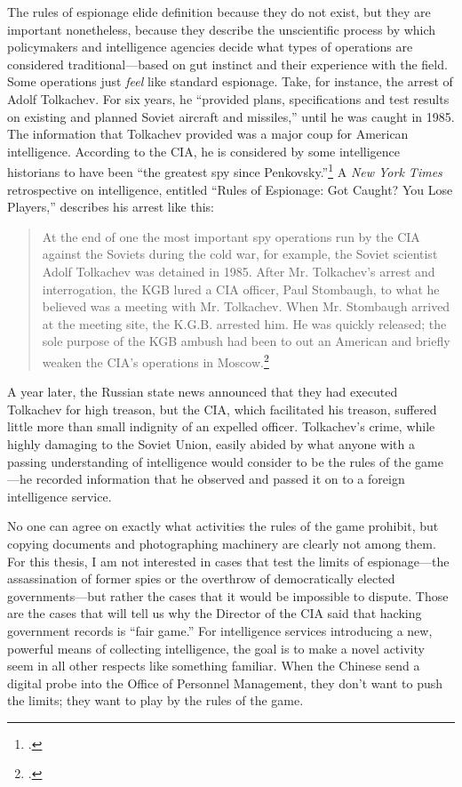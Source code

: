 \documentclass{memoir}
\begin{document}
\begin{refsegment}
The rules of espionage elide definition because they do not exist, but they are important nonetheless, because they describe the unscientific process by which policymakers and intelligence agencies decide what types of operations are considered traditional---based on gut instinct and their experience with the field. Some operations just \emph{feel} like standard espionage. Take, for instance, the arrest of Adolf Tolkachev.  For six years, he ``provided plans, specifications and test results on existing and planned Soviet aircraft and missiles,'' until he was caught in 1985. The information that Tolkachev provided was a major coup for American intelligence. According to the CIA, he is considered by some intelligence historians to have been ``the greatest spy since Penkovsky.''\footcite{cia_look_2008} A \emph{New York Times} retrospective on intelligence, entitled ``Rules of Espionage: Got Caught? You Lose Players,'' describes his arrest like this:

\begin{quote}
At the end of one the most important spy operations run by the CIA against the Soviets during the cold war, for example, the Soviet scientist Adolf Tolkachev was detained in 1985. After Mr. Tolkachev's arrest and interrogation, the KGB lured a CIA officer, Paul Stombaugh, to what he believed was a meeting with Mr. Tolkachev. When Mr. Stombaugh arrived at the meeting site, the K.G.B. arrested him. He was quickly released; the sole purpose of the KGB ambush had been to out an American and briefly weaken the CIA's operations in Moscow.\footcite{risen_rules_2001}
\end{quote}
A year later, the Russian state news announced that they had executed Tolkachev for high treason, but the CIA, which facilitated his treason, suffered little more than small indignity of an expelled officer. Tolkachev's crime, while highly damaging to the Soviet Union, easily abided by what anyone with a passing understanding of intelligence would consider to be the rules of the game---he recorded information that he observed and passed it on to a foreign intelligence service.

No one can agree on exactly what activities the rules of the game prohibit, but copying documents and photographing machinery are clearly not among them. For this thesis, I am not interested in cases that test the limits of espionage---the assassination of former spies or the overthrow of democratically elected governments---but rather the cases that it would be impossible to dispute. Those are the cases that will tell us why the Director of the CIA said that hacking government records is ``fair game.'' For intelligence services introducing a new, powerful means of collecting intelligence, the goal is to make a novel activity seem in all other respects like something familiar. When the Chinese send a digital probe into the Office of Personnel Management, they don't want to push the limits; they want to play by the rules of the game.


\end{refsegment}
\end{document}

